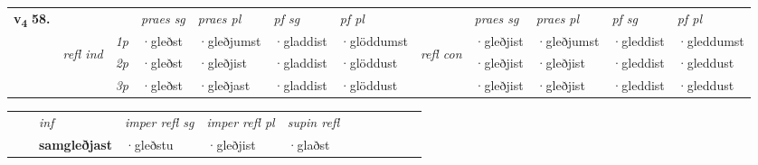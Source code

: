 \begin{tabular}{llllllllllll} \toprule
\multirow{4}{*}{{{\textbf{v{\textsubscript{4}}} \Large{\textbf{58.}}}}}  & &   &  \textit{praes sg}  & \textit{praes pl}  &\textit{pf sg} & \textit{pf pl} &  &  \textit{praes sg}  & \textit{praes pl}  & \textit{pf sg} & \textit{pf pl } \\*
	\cmidrule{4-7} \cmidrule{9-12}
 &\multirow{3}{*}{\begin{turn}{90}\textit{refl ind}\end{turn}} & {\textit{1p}} & ·gleðst & ·gleðjumst    & ·gladdist & ·glöddumst & \multirow{3}{*}{\begin{turn}{90}\textit{refl con}\end{turn}}  &·gleðjist & ·gleðjumst & ·gleddist & ·gleddumst\\*
 &&  {\textit{2p}} &  ·gleðst  & ·gleðjist   & ·gladdist & ·glöddust & &·gleðjist & ·gleðjist & ·gleddist & ·gleddust \\*
& &  {\textit{3p}} & ·gleðst & ·gleðjast   & ·gladdist & ·glöddust & & ·gleðjist & ·gleðjist& ·gleddist & ·gleddust  \\*
\cmidrule{4-7} \cmidrule{9-12}
\end{tabular}


\begin{tabular}{llllllllllll}
 & & \textit{inf}   & \textit{imper refl sg} & \textit{imper refl pl}   & \textit{supin refl}      \\*
  & & \textbf{samgleðjast}    & ·gleðstu & ·gleðjist   & ·glaðst  \\*
\cmidrule{1-12}
\end{tabular}




